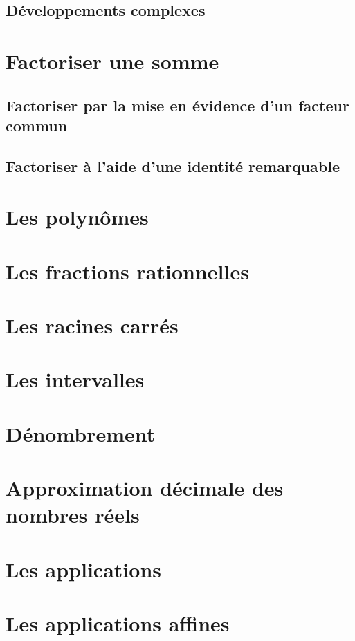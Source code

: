 \documentclass[12pt,a4paper]{report}
\begin{document}
\section{Développements complexes}

\chapter{Factoriser une somme}
\section{Factoriser par la mise en évidence d'un facteur commun}
\section{Factoriser à l'aide d'une identité remarquable}

\chapter{Les polynômes}

\chapter{Les fractions rationnelles}

\chapter{Les racines carrés}

\chapter{Les intervalles}

\chapter{Dénombrement}

\chapter{Approximation décimale des nombres réels}

\chapter{Les applications}

\chapter{Les applications affines}
\end{document}
